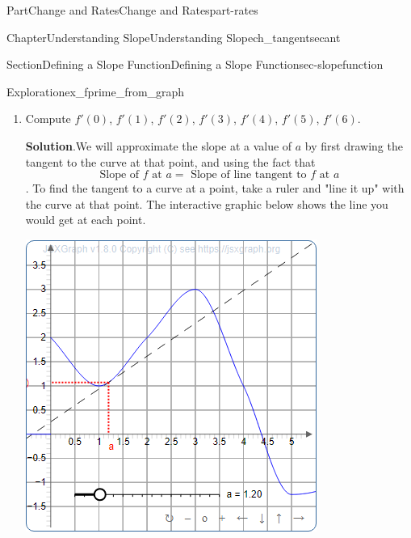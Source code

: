 \documentclass{tufte-book}
\newcommand{\blocktitlefont}{\relax}
\numberwithin{equation}{chapter}
\begin{document}
\begin{partptx}{Part}{Change and Rates}{}{Change and Rates}{}{}{part-rates}
\begin{chapterptx}{Chapter}{Understanding Slope}{}{Understanding Slope}{}{}{ch_tangentsecant}
\begin{sectionptx}{Section}{Defining a Slope Function}{}{Defining a Slope Function}{}{}{sec-slopefunction}
\begin{exploration}{Exploration}{}{ex_fprime_from_graph}
\begin{image}{0.125}{0.75}{0.125}{}
{\begin{tikzpicture}
\end{tikzpicture}
}%
\end{image}%
\begin{enumerate}[font=\bfseries,label=(\alph*),ref=\alph*]%
\item{}Compute \(f'(0)\), \(f'(1)\), \(f'(2)\), \(f'(3)\), \(f'(4)\), \(f'(5)\), \(f'(6)\).%
\par\smallskip%
\noindent\textbf{\blocktitlefont Solution}.\hypertarget{ex_fprime_from_graph-2-2}{}\quad{}We will approximate the slope at a value of \(a\) by first drawing the tangent to the curve at that point, and using the fact that%
\begin{equation*}
\text{Slope of  } f \text{ at }a = \text{ Slope of line tangent to }f \text{ at }a
\end{equation*}
. To find the tangent to a curve at a point, take a ruler and "line it up" with the curve at that point. The interactive graphic below shows the line you would get at each point.%
\par
\begin{sidebyside}{2}{0.075}{0.075}{0.17}%
\begin{sbspanel}{0.47}%
\includegraphics[width=\linewidth]{generated/preview/ex_fprime_from_graph-2-2-2-1-preview.png}
\end{sbspanel}%
\begin{sbspanel}{0.21}%

\end{sbspanel}
\end{sidebyside}
\end{enumerate}
\end{exploration}
\end{sectionptx}
\end{chapterptx}
\end{partptx}
\end{document}
